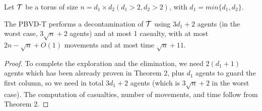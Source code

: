Let ${\cal T}$ be a   torus of size   $n=d_1\times d_2(d_1>2,d_2>2)$, with $d_1=min\{ d_1,d_2 \}$.

\begin{theorem}
The PBVD-T performs a decontamination of  ${\cal T}$  using $3d_1+2$ agents (in the worst case, 
$3\sqrt n+2$  agents) and at most 1 casualty,  with at most $2n-\sqrt{n}+O(1)$ movements and at most  time $\sqrt{n}+11$.
\end{theorem}
\begin{proof}
To complete the exploration and the elimination, we need $2(d_1+1)$ agents which has been alsready proven in Theorem 2, plus  $d_1$ agents to guard the first column, so we need in total $3d_1+2$ agents (which is $3\sqrt{n}+2$ in the worst case).  The computation of casualties,  number of movements, and   time   follow from Theorem 2.
\end{proof}






